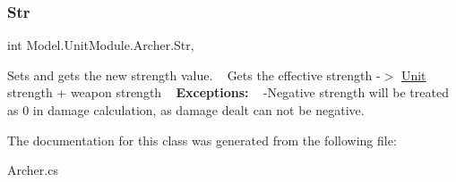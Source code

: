 \subsubsection{\texorpdfstring{Str}{Str}}
{\footnotesize\ttfamily int Model.\+Unit\+Module.\+Archer.\+Str\hspace{0.3cm}{\ttfamily [get]}, {\ttfamily [set]}}

Sets and gets the new strength value. ~\newline
 Gets the effective strength -\/$>$ \hyperlink{interface_model_1_1_unit_module_1_1_unit}{Unit} strength + weapon strength ~\newline
 {\bfseries Exceptions\+:} ~\newline
 -\/\+Negative strength will be treated as 0 in damage calculation, as damage dealt can not be negative. 

The documentation for this class was generated from the following file\+:\begin{DoxyCompactItemize}
\item 
Archer.\+cs\end{DoxyCompactItemize}
